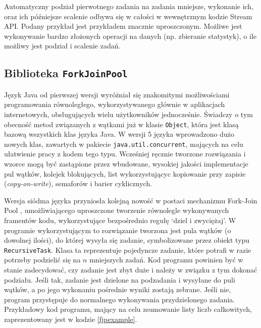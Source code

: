 \documentclass[12pt,twoside,openright]{extarticle}
\begin{document}
    Automatyczny podział pierwotnego zadania na zadania mniejsze, wykonanie ich, oraz ich późniejsze scalenie odbywa się w całości w wewnętrznym kodzie Stream API. Podany przykład jest przykładem znacznie uproszczonym. Możliwe jest wykonywanie bardzo złożonych operacji na danych (np. zbieranie statystyk), o ile możliwy jest podział i scalenie zadań.

\subsection{Biblioteka \texttt{ForkJoinPool}}

    Język Java od pierwszej wersji wyróżniał się znakomitymi możliwościami programowania równoległego, wykorzystywanego głównie w aplikacjach internetowych, obsługujących wielu użytkowników jednocześnie. Świadczy o tym obecność metod związanych z wątkami już w klasie \texttt{Object}, która jest klasą bazową wszystkich klas języka Java. W wersji 5 języka wprowadzono dużo nowych klas, zawartych w pakiecie \texttt{java.util.concurrent}, mających na celu ułatwienie pracy z kodem tego typu. Wcześniej ręcznie tworzone rozwiązania i wzorce mogą być zastąpione przez wbudowane, wysokiej jakości implementacje pul wątków, kolejek blokujących, list wykorzystującyc kopiowanie przy zapisie (\textit{copy-on-write}), semaforów i barier cyklicznych.
    
    Wersja siódma języka przyniosła kolejną nowość w postaci mechanizmu Fork-Join Pool \cite{fjpdocs}, umożliwiającego uproszczone tworzenie równolegle wykonywanych framentów kodu, wykorzystujące bezpośrednio regułę `dziel i zwyciężaj'. W programie wykorzystującym to rozwiązanie tworzona jest pula wątków (o dowolnej ilości), do której wysyła się zadanie, symbolizowane przez obiekt typu \texttt{RecursiveTask}. Klasa ta reprezentuje pojedyncze zadanie, które potrafi w razie potrzeby podzielić się na $ n $ mniejszych zadań. Kod programu powinien być w stanie zadecydować, czy zadanie jest zbyt duże i należy w związku z tym dokonać podziału. Jeśli tak, zadanie jest dzielone na podzadania i wysyłane do puli wątków, a po jego wykonaniu pośrednie wyniki zostają zebrane. Jeśli nie, program przystępuje do normalnego wykonywania przydzielonego zadania.  Przykładowy kod programu, mający na celu zsumowanie listy liczb całkowitych, zaprezentowany jest w kodzie \ref{fjpexample}.
\end{document}
